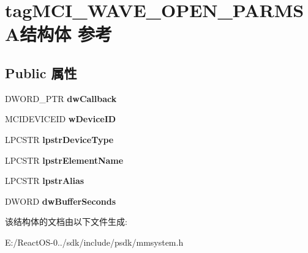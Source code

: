 \hypertarget{structtag_m_c_i___w_a_v_e___o_p_e_n___p_a_r_m_s_a}{}\section{tag\+M\+C\+I\+\_\+\+W\+A\+V\+E\+\_\+\+O\+P\+E\+N\+\_\+\+P\+A\+R\+M\+S\+A结构体 参考}
\label{structtag_m_c_i___w_a_v_e___o_p_e_n___p_a_r_m_s_a}
\subsection*{Public 属性}
\begin{DoxyCompactItemize}
\item 
\mbox{\label{structtag_m_c_i___w_a_v_e___o_p_e_n___p_a_r_m_s_a_a9ac096915f5c4759acf77b21d8d23bdd}} 
D\+W\+O\+R\+D\+\_\+\+P\+TR {\bfseries dw\+Callback}
\item 
\mbox{\label{structtag_m_c_i___w_a_v_e___o_p_e_n___p_a_r_m_s_a_a7c1ebb1ef2f2916ad5ebc79316570e43}} 
M\+C\+I\+D\+E\+V\+I\+C\+E\+ID {\bfseries w\+Device\+ID}
\item 
\mbox{\label{structtag_m_c_i___w_a_v_e___o_p_e_n___p_a_r_m_s_a_a6ad2ace3de8cb8c1aec2684c4d630ad9}} 
L\+P\+C\+S\+TR {\bfseries lpstr\+Device\+Type}
\item 
\mbox{\label{structtag_m_c_i___w_a_v_e___o_p_e_n___p_a_r_m_s_a_a2c5003683928d6fca8d6aebc3eb3a84b}} 
L\+P\+C\+S\+TR {\bfseries lpstr\+Element\+Name}
\item 
\mbox{\label{structtag_m_c_i___w_a_v_e___o_p_e_n___p_a_r_m_s_a_abd26480f9fd43ba956a840380193d9ac}} 
L\+P\+C\+S\+TR {\bfseries lpstr\+Alias}
\item 
\mbox{\label{structtag_m_c_i___w_a_v_e___o_p_e_n___p_a_r_m_s_a_a3d322352ea481189bc63a5afcbe88de0}} 
D\+W\+O\+RD {\bfseries dw\+Buffer\+Seconds}
\end{DoxyCompactItemize}


该结构体的文档由以下文件生成\+:\begin{DoxyCompactItemize}
\item 
E\+:/\+React\+O\+S-\/0../sdk/include/psdk/mmsystem.\+h\end{DoxyCompactItemize}
